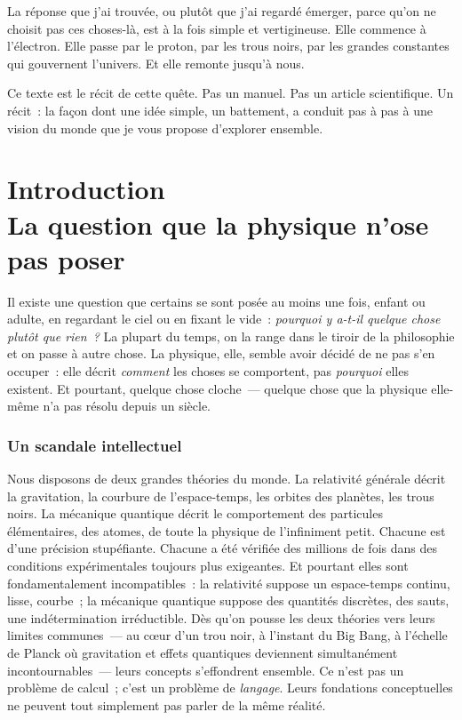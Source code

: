 \documentclass[12pt, a4paper, openright]{book}
\begin{document}
\medskip

La réponse que j'ai trouvée, ou plutôt que j'ai regardé émerger, parce qu'on ne choisit pas ces choses-là, est à la fois simple et vertigineuse. Elle commence à l'électron. Elle passe par le proton, par les trous noirs, par les grandes constantes qui gouvernent l'univers. Et elle remonte jusqu'à nous.

\medskip

Ce texte est le récit de cette quête. Pas un manuel. Pas un article scientifique. Un récit~: la façon dont une idée simple, un battement, a conduit pas à pas à une vision du monde que je vous propose d'explorer ensemble.

\clearpage

\chapter[Introduction]{Introduction\\ La question que la physique n'ose pas poser}

Il existe une question que certains se sont posée au moins une fois, enfant ou adulte, en regardant le ciel ou en fixant le vide~: \emph{pourquoi y a-t-il quelque chose plutôt que rien~?} La plupart du temps, on la range dans le tiroir de la philosophie et on passe à autre chose. La physique, elle, semble avoir décidé de ne pas s'en occuper~: elle décrit \emph{comment} les choses se comportent, pas \emph{pourquoi} elles existent. Et pourtant, quelque chose cloche~--- quelque chose que la physique elle-même n'a pas résolu depuis un siècle.

\subsection*{Un scandale intellectuel}

Nous disposons de deux grandes théories du monde. La relativité générale décrit la gravitation, la courbure de l'espace-temps, les orbites des planètes, les trous noirs. La mécanique quantique décrit le comportement des particules élémentaires, des atomes, de toute la physique de l'infiniment petit. Chacune est d'une précision stupéfiante. Chacune a été vérifiée des millions de fois dans des conditions expérimentales toujours plus exigeantes. Et pourtant elles sont fondamentalement incompatibles~: la relativité suppose un espace-temps continu, lisse, courbe~; la mécanique quantique suppose des quantités discrètes, des sauts, une indétermination irréductible. Dès qu'on pousse les deux théories vers leurs limites communes~--- au c\oe{}ur d'un trou noir, à l'instant du Big Bang, à l'échelle de Planck où gravitation et effets quantiques deviennent simultanément incontournables~--- leurs concepts s'effondrent ensemble. Ce n'est pas un problème de calcul~; c'est un problème de \emph{langage}. Leurs fondations conceptuelles ne peuvent tout simplement pas parler de la même réalité.
\end{document}
